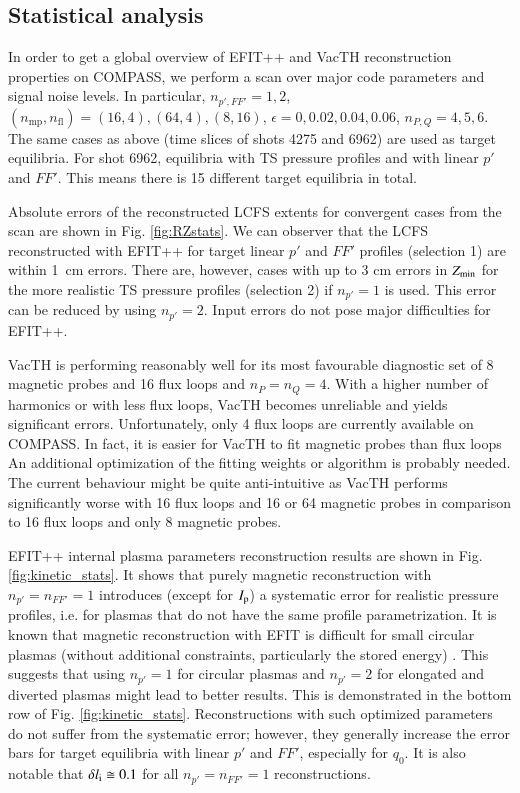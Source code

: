 \subsection{Statistical analysis} %
\label{sub:statistical_analysis}

In order to get a global overview of EFIT++ and VacTH reconstruction properties on COMPASS, we perform a scan over major code parameters and signal noise levels. In particular, $n_{p',FF'} = 1,2 $, $(n_\mathrm{mp}, n_\mathrm{fl}) = (16, 4), (64, 4), (8, 16)$, $\epsilon = 0, 0.02, 0.04, 0.06$, $n_{P,Q} = 4, 5, 6$. The same cases as above (time slices of shots 4275 and 6962) are used as target equilibria. For shot 6962, equilibria with TS pressure profiles and with linear $p'$ and $FF'$. This means there is 15 different target equilibria in total.

Absolute errors of the reconstructed LCFS extents for convergent cases from the scan are shown in Fig. \ref{fig:RZstats}. We can observer that the LCFS reconstructed with EFIT++ for target linear $p'$ and $FF'$ profiles (selection 1) are within 1~cm errors. There are, however, cases with up to 3 cm errors in $Z_{\rm{min}}$ for the more realistic TS pressure profiles (selection 2) if $n_{p'}=1$ is used. This error can be reduced by using $n_{p'}=2$. Input errors do not pose major difficulties for EFIT++. 

VacTH is performing reasonably well for its most favourable diagnostic set of 8 magnetic probes and 16 flux loops and $n_P = n_Q = 4$. With a higher number of harmonics or with less flux loops, VacTH becomes unreliable and yields significant errors. Unfortunately, only 4 flux loops are currently available on COMPASS. In fact, it is easier for VacTH to fit magnetic probes than flux loops
An additional optimization of the fitting weights or algorithm is probably needed. The current behaviour might be quite anti-intuitive as VacTH performs significantly worse with 16 flux loops and 16 or 64 magnetic probes in comparison to 16 flux loops and only 8 magnetic probes. 

EFIT++ internal plasma parameters reconstruction results are shown in Fig. \ref{fig:kinetic_stats}. It shows that purely magnetic reconstruction with $n_{p'}=n_{FF'}=1$ introduces (except for $I_{\rm{p}}$) a systematic error for realistic pressure profiles, i.e. for plasmas that do not have the same profile parametrization. 
It is known that magnetic reconstruction with EFIT is difficult for small circular plasmas (without additional constraints, particularly the stored energy) \cite{efit1985}.
This suggests that using $n_{p'}=1$ for circular plasmas and $n_{p'}=2$ for elongated and diverted plasmas might lead to better results. This is demonstrated in the bottom row of Fig. \ref{fig:kinetic_stats}.
Reconstructions with such optimized parameters do not suffer from the systematic error; however, they generally increase the error bars for target equilibria with linear $p'$ and $FF'$, especially for $q_0$. It is also notable that $\delta l_{\rm{i}} \cong 0.1$ for all $n_{p'}=n_{FF'}=1$ reconstructions.

